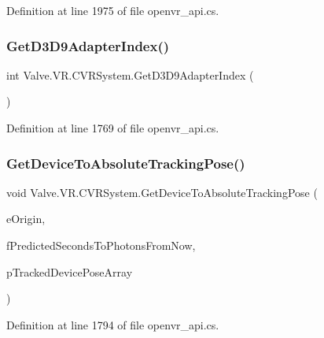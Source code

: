 Definition at line 1975 of file openvr\+\_\+api.\+cs.

\mbox{\label{class_valve_1_1_v_r_1_1_c_v_r_system_a7afe0eda4e65687842208f8ce905a64e}} 
\subsubsection{\texorpdfstring{GetD3D9AdapterIndex()}{GetD3D9AdapterIndex()}}
{\footnotesize\ttfamily int Valve.\+V\+R.\+C\+V\+R\+System.\+Get\+D3\+D9\+Adapter\+Index (\begin{DoxyParamCaption}{ }\end{DoxyParamCaption})}



Definition at line 1769 of file openvr\+\_\+api.\+cs.

\mbox{\label{class_valve_1_1_v_r_1_1_c_v_r_system_abb17d53b9f9ac2fbb29cde9e0805826e}} 
\subsubsection{\texorpdfstring{GetDeviceToAbsoluteTrackingPose()}{GetDeviceToAbsoluteTrackingPose()}}
{\footnotesize\ttfamily void Valve.\+V\+R.\+C\+V\+R\+System.\+Get\+Device\+To\+Absolute\+Tracking\+Pose (\begin{DoxyParamCaption}\item[{\mbox{\hyperlink{namespace_valve_1_1_v_r_a29be99a3c2f780157bd490db06a7f12f}{E\+Tracking\+Universe\+Origin}}}]{e\+Origin,  }\item[{float}]{f\+Predicted\+Seconds\+To\+Photons\+From\+Now,  }\item[{\mbox{\hyperlink{struct_valve_1_1_v_r_1_1_tracked_device_pose__t}{Tracked\+Device\+Pose\+\_\+t}} \mbox{[}$\,$\mbox{]}}]{p\+Tracked\+Device\+Pose\+Array }\end{DoxyParamCaption})}



Definition at line 1794 of file openvr\+\_\+api.\+cs.

